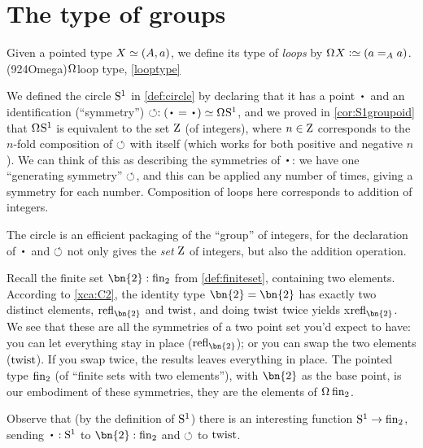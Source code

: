 \section{The type of groups}
\label{sec:typegroup}

\begin{definition}\label{looptype}
  Given a pointed type $X\jdeq(A,a)$, we define its type of \emph{loops}
  by $\loops X \defeq (a =_A a)$.%
  \glossary(924Omega){$\protect\loops$}{loop type, \cref{looptype}}
\end{definition}
\begin{example}\label{ex:base=base}
  We defined the circle ${\mathrm{S}^1}$ in \cref{def:circle} by declaring
  that it has a point $\base$ and an identification (``symmetry'')
  $\Sloop:(\base=\base) \jdeq \loops\Sc$,
  and we proved in \cref{cor:S1groupoid} that $\loops\Sc$ is equivalent
  to the set $\mathrm{Z}$ (of integers),
  where $n\in\mathrm{Z}$ corresponds to the $n$-fold composition of $\circlearrowleft$ with itself
  (which works for both positive and negative $n$).
  We can think of this as describing the symmetries of $\base$:
  we have one ``generating symmetry'' $\circlearrowleft$,
  and this can be applied any number of times,
  giving a symmetry for each number.
  Composition of loops here corresponds to addition of integers.

  The circle is an efficient packaging of the ``{group}'' of integers, for the declaration of $\base$ and $\circlearrowleft$ not only gives the \emph{set}
  $\mathrm{Z}$ of integers, but also the addition operation.
\end{example}
\begin{example}
  Recall the finite set $\bn{2}:\fin_2$ from \cref{def:finiteset}, containing two elements.
  According to \cref{xca:C2}, the identity type $\bn{2} =\bn{2} $ has exactly two distinct elements,
  $\refl{\bn{2}}$ and $\mathrm{twist}$,
  and doing $\mathrm{twist}$ twice yields x$\refl{\bn{2}}$.
  We see that these are all the symmetries
  of a two point set you'd expect to have:
  you can let everything stay in place ($\refl{\bn{2}}$);
  or you can swap the two elements ($\mathrm{twist}$).
  If you swap twice, the results leaves everything in place.
  The pointed type $\fin_2$ (of ``finite sets with two elements''),
  with $\bn{2}$ as the base point,
  is our embodiment of these symmetries, \ie they are the elements of $\loops\fin_2$.

  Observe that (by the definition of ${\mathrm{S}^1}$)
  there is an interesting function $\Sc\to\fin_2$,
  sending $\base:\Sc$ to $\bn{2} :\fin_2$ and $\circlearrowleft$ to $\mathrm{twist}$.
\end{example}


